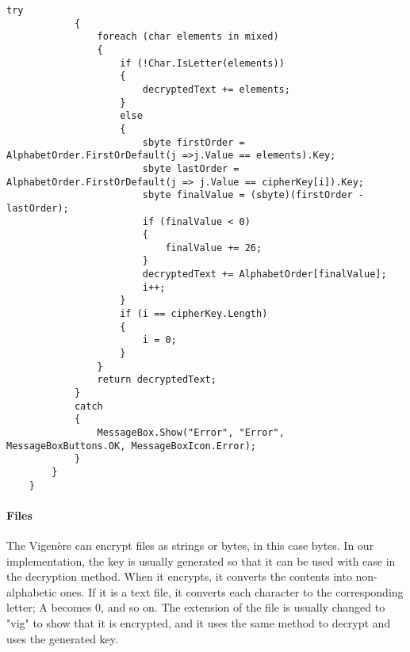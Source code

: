\begin{lstlisting}[caption=Vigenère Cipher Text Source Code]
            try
            {
                foreach (char elements in mixed)
                {
                    if (!Char.IsLetter(elements))
                    {
                        decryptedText += elements;
                    }
                    else
                    {
                        sbyte firstOrder = AlphabetOrder.FirstOrDefault(j =>j.Value == elements).Key; 
                        sbyte lastOrder = AlphabetOrder.FirstOrDefault(j => j.Value == cipherKey[i]).Key;
                        sbyte finalValue = (sbyte)(firstOrder - lastOrder);
                        if (finalValue < 0) 
                        {
                            finalValue += 26;
                        }
                        decryptedText += AlphabetOrder[finalValue]; 
                        i++;
                    }
                    if (i == cipherKey.Length) 
                    {
                        i = 0;
                    }
                }
                return decryptedText;
            }
            catch 
            {
                MessageBox.Show("Error", "Error", MessageBoxButtons.OK, MessageBoxIcon.Error);
            }
        }
    }
\end{lstlisting}

\paragraph{Files\\}
The Vigenère can encrypt files as strings or bytes, in this case bytes. In our implementation, the key is usually generated so that it can be used with ease in the decryption method. When it encrypts, it converts the contents into non-alphabetic ones. If it is a text file, it converts each character to the corresponding letter; A becomes 0, and so on. The extension of the file is usually changed to "vig" to show that it is encrypted, and it uses the same method to decrypt and uses the generated key.

